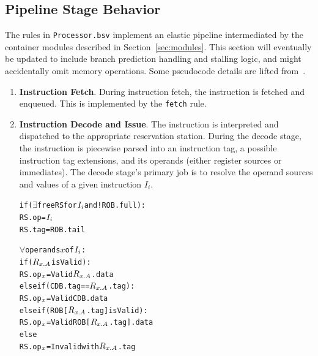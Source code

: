 \documentclass[12pt]{article}
\newcommand{\mtt}[1]{\(#1\)}
\begin{document}
\subsection{Pipeline Stage Behavior\label{sec:stages}}
The rules in \verb=Processor.bsv= implement an elastic pipeline intermediated by the container modules
described in Section~\ref{sec:modules}. This section will eventually be updated to include branch prediction
handling and stalling logic, and might accidentally omit memory operations. Some pseudocode details are lifted from~\cite{99KMP}.
\begin{enumerate}
    \item \textbf{Instruction Fetch}. During instruction fetch, the instruction is fetched and enqueued. This
    is implemented by the \verb=fetch= rule.
        
    \item \textbf{Instruction Decode and Issue}. The instruction is interpreted and dispatched to the appropriate
    reservation station. During the decode stage, the instruction is piecewise parsed into an instruction 
    tag, a possible instruction tag extensions, and its operands (either register sources or immediates). The 
    decode stage's primary job is to resolve the operand sources and values of a given instruction $I_i$. 
       \begin{alltt}
           if (\mtt{\exists} free RS for \mtt{I\sb{i}} and !ROB.full):
               RS.op =  \mtt{I\sb{i}}
               RS.tag = ROB.tail
               
               \mtt{\forall} operands \mtt{x} of \mtt{I\sb{i}}:
                   if (\mtt{R\sb{x.A}} is Valid):
                       RS.op\mtt{\sb{x}} = Valid \mtt{R\sb{x.A}}.data
                   else if (CDB.tag == \mtt{R\sb{x.A}}.tag):
                       RS.op\mtt{\sb{x}} = Valid CDB.data
                   else if (ROB[\mtt{R\sb{x.A}}.tag] is Valid):
                       RS.op\mtt{\sb{x}} = Valid ROB[\mtt{R\sb{x.A}}.tag].data
                   else
                       RS.op\mtt{\sb{x}} = Invalid with \mtt{R\sb{x.A}}.tag
                       

\end{alltt}
\end{enumerate}
\end{document}
